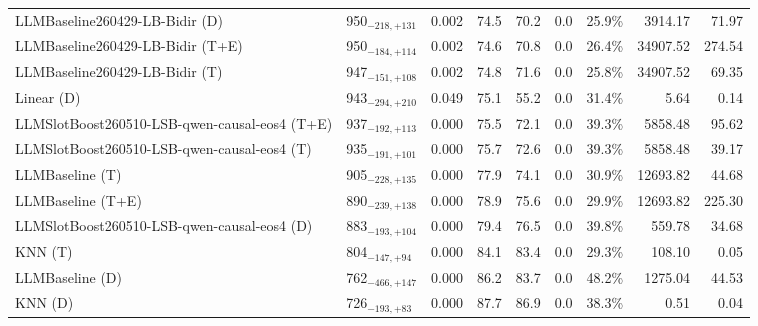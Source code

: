 \begin{tabular}{llcccccrr}
LLMBaseline260429-LB-Bidir (D) & 950${}_{-218,+131}$ & 0.002 & 74.5 & 70.2 & 0.0 & 25.9\% & 3914.17 & 71.97 \\
LLMBaseline260429-LB-Bidir (T+E) & 950${}_{-184,+114}$ & 0.002 & 74.6 & 70.8 & 0.0 & 26.4\% & 34907.52 & 274.54 \\
LLMBaseline260429-LB-Bidir (T) & 947${}_{-151,+108}$ & 0.002 & 74.8 & 71.6 & 0.0 & 25.8\% & 34907.52 & 69.35 \\
Linear (D) & 943${}_{-294,+210}$ & 0.049 & 75.1 & 55.2 & 0.0 & 31.4\% & 5.64 & 0.14 \\
LLMSlotBoost260510-LSB-qwen-causal-eos4 (T+E) & 937${}_{-192,+113}$ & 0.000 & 75.5 & 72.1 & 0.0 & 39.3\% & 5858.48 & 95.62 \\
LLMSlotBoost260510-LSB-qwen-causal-eos4 (T) & 935${}_{-191,+101}$ & 0.000 & 75.7 & 72.6 & 0.0 & 39.3\% & 5858.48 & 39.17 \\
LLMBaseline (T) & 905${}_{-228,+135}$ & 0.000 & 77.9 & 74.1 & 0.0 & 30.9\% & 12693.82 & 44.68 \\
LLMBaseline (T+E) & 890${}_{-239,+138}$ & 0.000 & 78.9 & 75.6 & 0.0 & 29.9\% & 12693.82 & 225.30 \\
LLMSlotBoost260510-LSB-qwen-causal-eos4 (D) & 883${}_{-193,+104}$ & 0.000 & 79.4 & 76.5 & 0.0 & 39.8\% & 559.78 & 34.68 \\
KNN (T) & 804${}_{-147,+94}$ & 0.000 & 84.1 & 83.4 & 0.0 & 29.3\% & 108.10 & 0.05 \\
LLMBaseline (D) & 762${}_{-466,+147}$ & 0.000 & 86.2 & 83.7 & 0.0 & 48.2\% & 1275.04 & 44.53 \\
KNN (D) & 726${}_{-193,+83}$ & 0.000 & 87.7 & 86.9 & 0.0 & 38.3\% & 0.51 & 0.04 \\
\bottomrule
\end{tabular}